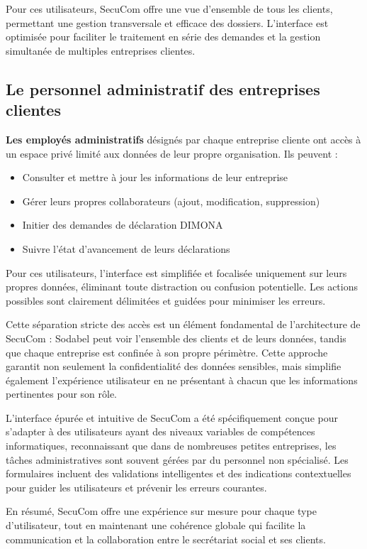 \documentclass[12pt,a4paper]{report}
\begin{document}
Pour ces utilisateurs, SecuCom offre une vue d'ensemble de tous les clients, permettant une gestion transversale et efficace des dossiers. L'interface est optimisée pour faciliter le traitement en série des demandes et la gestion simultanée de multiples entreprises clientes.

\subsection{Le personnel administratif des entreprises clientes}

\textbf{Les employés administratifs} désignés par chaque entreprise cliente ont accès à un espace privé limité aux données de leur propre organisation. Ils peuvent :
\begin{itemize}
  \item Consulter et mettre à jour les informations de leur entreprise
  \item Gérer leurs propres collaborateurs (ajout, modification, suppression)
  \item Initier des demandes de déclaration DIMONA
  \item Suivre l'état d'avancement de leurs déclarations
\end{itemize}

Pour ces utilisateurs, l'interface est simplifiée et focalisée uniquement sur leurs propres données, éliminant toute distraction ou confusion potentielle. Les actions possibles sont clairement délimitées et guidées pour minimiser les erreurs.

Cette séparation stricte des accès est un élément fondamental de l'architecture de SecuCom : Sodabel peut voir l'ensemble des clients et de leurs données, tandis que chaque entreprise est confinée à son propre périmètre. Cette approche garantit non seulement la confidentialité des données sensibles, mais simplifie également l'expérience utilisateur en ne présentant à chacun que les informations pertinentes pour son rôle.

L'interface épurée et intuitive de SecuCom a été spécifiquement conçue pour s'adapter à des utilisateurs ayant des niveaux variables de compétences informatiques, reconnaissant que dans de nombreuses petites entreprises, les tâches administratives sont souvent gérées par du personnel non spécialisé. Les formulaires incluent des validations intelligentes et des indications contextuelles pour guider les utilisateurs et prévenir les erreurs courantes.

En résumé, SecuCom offre une expérience sur mesure pour chaque type d'utilisateur, tout en maintenant une cohérence globale qui facilite la communication et la collaboration entre le secrétariat social et ses clients.
\end{document}
